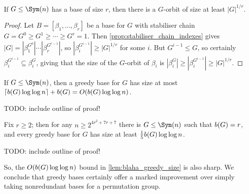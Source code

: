 \begin{lemma}\label{lem:blaha_greedy_orbit}
    If $G \leq \Sym(n)$ has a base of size $r$, then there is a $G$-orbit of size at least $|G|^{1/r}$.
\end{lemma}

\begin{proof}
    Let $B = [\beta_1,\dotsc,\beta_r]$ be a base for $G$ with stabiliser chain $G = G^0 \geq G^1 \geq \dotsb \geq G^r = 1$. Then \autoref{prop:stabiliser_chain_indexes} gives $|G| = |\beta_1^{G^0}| \dotsb |\beta_r^{G^{r-1}}|$, so $|\beta_i^{G^{i-1}}| \geq |G|^{1/r}$ for some $i$. But $G^{i-1} \leq G$, so certainly $\beta_i^{G^{i-1}} \subseteq \beta_i^G$, giving that the size of the $G$-orbit of $\beta_i$ is $|\beta_i^G| \geq |\beta_i^{G^{i-1}}| \geq |G|^{1/r}$.
\end{proof}

\begin{theorem}\label{lem:blaha_greedy_size}
    If $G \leq \Sym(n)$, then a greedy base for $G$ has size at most $\lceil \added{2}{b(G)}\log\log n \rceil + \added{2}{b(G)} = O(\added{2}{b(G)}\log\log n)$.
\end{theorem}

TODO: include outline of proof!



\begin{theorem}\label{thm:blaha_greedy_sharp}
    Fix $r \geq 2$; then for any $n \geq 2^{4r^2 + 7r + 7}$ there is $G \leq \Sym(n)$ such that $\added{2}{b(G)} = r$, and every greedy base for $G$ has size at least $\frac{1}{5}\added{2}{b(G)}\log\log n$.
\end{theorem}

TODO: include outline of proof!

So, the $O(\added{2}{b(G)}\log\log n)$ bound in \autoref{lem:blaha_greedy_size} is also sharp. We conclude that greedy bases certainly offer a marked improvement over simply taking nonredundant bases for a permutation group.